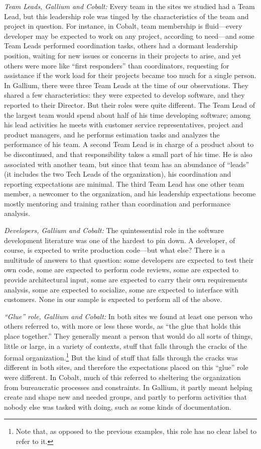 \documentclass[10pt, conference, compsocconf]{IEEEtran}
\begin{document}
\emph{Team Leads, Gallium and Cobalt:} Every team in the sites we studied had a Team Lead, but this leadership role was tinged by the characteristics of the team and project in question. For instance, in Cobalt, team membership is fluid---every developer may be expected to work on any project, according to need---and some Team Leads performed coordination tasks, others had a dormant leadership position, waiting for new issues or concerns in their projects to arise, and yet others were more like ``first responders'' than coordinators, requesting for assistance if the work load for their projects became too much for a single person. In Gallium, there were three Team Leads at the time of our observations. They shared a few characteristics: they were expected to develop software, and they reported to their Director. But their roles were quite different. The Team Lead of the largest team would spend about half of his time developing software; among his lead activities he meets with customer service representatives, project and product managers, and he performs estimation tasks and analyzes the performance of his team. A second Team Lead is in charge of a product about to be discontinued, and that responsibility takes a small part of his time. He is also associated with another team, but since that team has an abundance of ``leads'' (it includes the two Tech Leads of the organization), his coordination and reporting expectations are minimal. The third Team Lead has one other team member, a newcomer to the organization, and his leadership expectations become mostly mentoring and training rather than coordination and performance analysis.

\emph{Developers, Gallium and Cobalt:} The quintessential role in the software development literature was one of the hardest to pin down. A developer, of course, is expected to write production code---but what else? There is a multitude of answers to that question: some developers are expected to test their own code, some are expected to perform code reviews, some are expected to provide architectural input, some are expected to carry their own requirements analysis, some are expected to socialize, some are expected to interface with customers. None in our sample is expected to perform all of the above.

\emph{``Glue'' role, Gallium and Cobalt:} In both sites we found at least one person who others referred to, with more or less these words, as ``the glue that holds this place together.'' They generally meant a person that would do all sorts of things, little or large, in a variety of contexts, stuff that falls through the cracks of the formal organization.\footnote{Note that, as opposed to the previous examples, this role has no clear label to refer to it.} But the kind of stuff that falls through the cracks was different in both sites, and therefore the expectations placed on this ``glue'' role were different. In Cobalt, much of this referred to sheltering the organization from bureaucratic processes and constraints. In Gallium, it partly meant helping create and shape new and needed groups, and partly to perform activities that nobody else was tasked with doing, such as some kinds of documentation.
\end{document}
